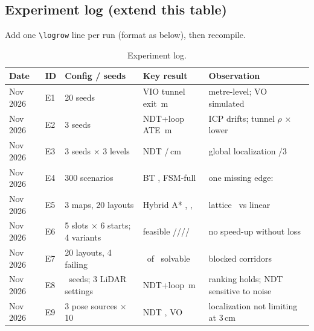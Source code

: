 \documentclass[11pt,a4paper]{article}
\begin{document}
\subsection{Experiment log (extend this table)}
Add one \verb|\logrow| line per run (format as below), then recompile.
\newcommand{\logrow}[5]{#1 & #2 & #3 & #4 & #5 \\}
\begin{table}[H]\centering\footnotesize
\caption{Experiment log.}
\begin{tabular}{llp{2.9cm}p{3.6cm}p{4.2cm}}\toprule
Date & ID & Config / seeds & Key result & Observation\\\midrule
\logrow{Nov 2026}{E1}{20 seeds}{VIO tunnel exit \vioExitVio\,m}{metre-level; VO simulated}
\logrow{Nov 2026}{E2}{3 seeds}{NDT+loop ATE \slamLoop\,m}{ICP drifts; tunnel $\rho$ \slamDegRatio$\times$ lower}
\logrow{Nov 2026}{E3}{3 seeds $\times$ 3 levels}{NDT \hdNdtLon/\hdNdtLat\,cm}{global localization \hdGlobOk/3}
\logrow{Nov 2026}{E4}{300 scenarios}{BT \btOk, FSM-full \fsmFullOk}{one missing edge: \fsmNoRecheckOk}
\logrow{Nov 2026}{E5}{3 maps, 20 layouts}{Hybrid A* \hyPerp, \hyPar, \hyK}{lattice \latQuinticOk\ vs linear \latLinearOk}
\logrow{Nov 2026}{E6}{5 slots $\times$ 6 starts; 4 variants}{feasible \slotOkA/\slotOkB/\slotOkC/\slotOkD/\slotOkE}{no speed-up without loss}
\logrow{Nov 2026}{E7}{20 layouts, 4 failing}{\lfSolvZero\ of \lfFail\ solvable}{blocked corridors}
\logrow{Nov 2026}{E8}{\sensSeeds\ seeds; 3 LiDAR settings}{NDT+loop \sensSlamLoop\,m}{ranking holds; NDT sensitive to noise}
\logrow{Nov 2026}{E9}{3 pose sources $\times$ 10}{NDT \clNdt, VO \clDr}{localization not limiting at 3\,cm}
\bottomrule\end{tabular}\end{table}
\end{document}
